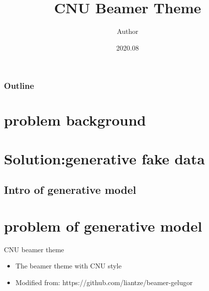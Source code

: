 \documentclass{beamer}
\title{CNU Beamer Theme}
\author{Author}
\institute{University of Science and Technology of China}
\date {2020.08}
\begin{document}
\begin{frame}
\titlepage
\end{frame}



\begin{frame}
	\frametitle{Outline}
\tableofcontents
\end{frame}

\section{problem background}
\begin{frame}
    
\end{frame}
\begin{frame}
    
\end{frame}
\section{Solution:generative fake data}
\begin{frame}
    
\end{frame}
\subsection{Intro of generative model}
\begin{frame}
    
\end{frame}
\section{problem of generative model}
\begin{frame}
    
\end{frame}
\begin{frame}{CNU beamer theme}
\begin{itemize}
    \item The beamer theme with CNU style
    \item Modified from: https://github.com/liantze/beamer-gelugor 
\end{itemize}
\end{frame}
\end{document}
